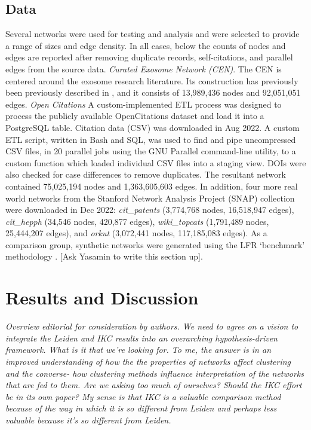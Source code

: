 \documentclass[12pt, oneside]{article}   	%
\begin{document}
\subsection{Data} Several networks were used for testing and analysis and were selected to provide a range of sizes and edge density. In all cases, below the counts of nodes and edges are reported after removing duplicate records, 
self-citations, and parallel edges from the source data. \emph{Curated Exosome Network (CEN)}. The CEN is centered around the exosome research literature. Its construction has previously been previously described in \citep{Jakatdar_2022}, and it consists of 13,989,436 nodes and 92,051,051 edges.  \emph{Open Citations} A custom-implemented ETL process was designed to process the publicly available OpenCitations dataset \citep{Peroni2020} and load it into a PostgreSQL table. Citation data (CSV) was downloaded in Aug 2022. A custom ETL script, written in Bash and SQL, was used to find and pipe uncompressed CSV files, in 20 parallel jobs using the GNU Parallel command-line utility, to a custom function which loaded individual CSV files into a staging view. DOIs were also checked for case differences to remove duplicates.  The resultant network contained 75,025,194 nodes and 1,363,605,603 edges.  In addition, four more real world networks from the Stanford Network Analysis Project (SNAP) collection \citep{leskovec2016snap} were downloaded in Dec 2022: \emph{cit\_patents} (3,774,768 nodes, 16,518,947 edges), \emph{cit\_hepph} (34,546 nodes, 420,877 edges), \emph{wiki\_topcats} (1,791,489 nodes, 25,444,207 edges), and \emph{orkut} (3,072,441 nodes, 117,185,083 edges). As a comparison group, synthetic networks were generated using the LFR `benchmark' methodology \citep{Lancichinetti2008}. [Ask Yasamin to write this section up].

\section{Results and Discussion}

\emph{Overview editorial for consideration by authors. We need to agree on a vision to integrate the Leiden and IKC results into an overarching hypothesis-driven framework. What is it that we're looking for. To me, the answer is in an improved understanding of how the the properties of networks affect clustering and the converse- how clustering methods influence interpretation of the networks that are fed to them. Are we asking too much of ourselves? Should the IKC effort be in its own paper? My sense is that IKC is a valuable comparison method because of the way in which it is so different from Leiden and perhaps less valuable because it's so different from Leiden.}
\end{document}
